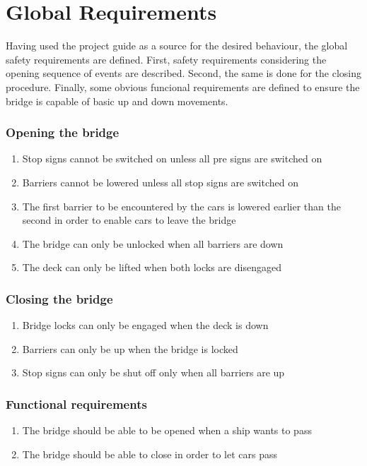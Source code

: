 \section{Global Requirements}
\label{sec:glob}

Having used the project guide as a source for the desired behaviour, the global safety requirements are defined. First, safety requirements considering the opening sequence of events are described. Second, the same is done for the closing procedure. Finally, some obvious funcional requirements are defined to ensure the bridge is capable of basic up and down movements.

\subsubsection*{Opening the bridge}
\begin{enumerate}
	\item Stop signs cannot be switched on unless all pre signs are switched on
	\item Barriers cannot be lowered unless all stop signs are switched on
	\item The first barrier to be encountered by the cars is lowered earlier than the second in order to enable cars to leave the bridge
	\item The bridge can only be unlocked when all barriers are down
	\item The deck can only be lifted when both locks are disengaged
	\setcounter{enumTemp}{\theenumi}
\end{enumerate}

\subsubsection*{Closing the bridge}
\begin{enumerate}
	\setcounter{enumi}{\theenumTemp}
	\item Bridge locks can only be engaged when the deck is down
	\item Barriers can only be up when the bridge is locked
	\item Stop signs can only be shut off only when all barriers are up
	\setcounter{enumTemp}{\theenumi}
\end{enumerate}

\subsubsection*{Functional requirements}
\begin{enumerate}
	\setcounter{enumi}{\theenumTemp}
	\item The bridge should be able to be opened when a ship wants to pass
	\item The bridge should be able to close in order to let cars pass
	\setcounter{enumTemp}{\theenumi}
\end{enumerate}


